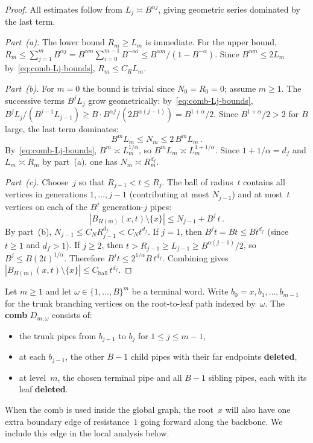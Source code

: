 \documentclass[11pt]{amsart}
\theoremstyle{plain}
\theoremstyle{definition}
\begin{document}
	\begin{proof}
		All estimates follow from $L_j\asymp B^{\alpha j}$, giving geometric series dominated by the last term.
		
		\emph{Part~\textup{(a)}.}  The lower bound $R_m\geq L_m$ is immediate.  For the upper bound, $R_m\leq\sum_{j=1}^m B^{\alpha j} =B^{\alpha m}\sum_{i=0}^{m-1}B^{-\alpha i} \leq B^{\alpha m}/(1-B^{-\alpha})$.  Since $B^{\alpha m}\leq 2L_m$ by~\eqref{eq:comb-Lj-bounds}, $R_m\leq C_R L_m$.
		
		\emph{Part~\textup{(b)}.}  For $m=0$ the bound is trivial since $N_0=R_0=0$; assume $m\geq 1$.
		The successive terms $B^j L_j$ grow geometrically: by~\eqref{eq:comb-Lj-bounds}, $B^j L_j/(B^{j-1}L_{j-1}) \geq B\cdot B^{\alpha j}/(2B^{\alpha(j-1)}) =B^{1+\alpha}/2$.  Since $B^{1+\alpha}/2>2$ for $B$ large, the last term dominates:
		\begin{equation}\label{eq:rec-Nm-asymp}
			B^m L_m\leq N_m\leq 2\,B^m L_m\,.
		\end{equation}
		By~\eqref{eq:comb-Lj-bounds}, $B^m\asymp L_m^{1/\alpha}$, so $B^m L_m\asymp L_m^{1+1/\alpha}$.  Since $1+1/\alpha=d_f$ and $L_m\asymp R_m$ by part~(a), one has $N_m\asymp R_m^{d_f}$.
		
		\emph{Part~\textup{(c)}.}  Choose~$j$ so that $R_{j-1}<t\leq R_j$.  The ball of radius~$t$ contains all vertices in generations $1,\ldots,j{-}1$ (contributing at most $N_{j-1}$) and at most~$t$ vertices on each of the $B^j$ generation-$j$ pipes:
		\begin{equation}\label{eq:rec-ball-bound}
			|B_{H(m)}(x,t)\setminus\{x\}|
			\leq N_{j-1}+B^j\,t\,.
		\end{equation}
		By part~(b), $N_{j-1}\leq C_N R_{j-1}^{d_f} <C_N t^{d_f}$.  If $j=1$, then $B^j t=Bt\leq B t^{d_f}$ (since $t\geq 1$ and $d_f>1$).  If $j\geq 2$, then $t>R_{j-1}\geq L_{j-1} \geq B^{\alpha(j-1)}/2$, so $B^j\leq B(2t)^{1/\alpha}$.  Therefore $B^j t\leq 2^{1/\alpha}B\,t^{d_f}$.  Combining gives $|B_{H(m)}(x,t)\setminus\{x\}| \leq C_{\mathrm{ball}}\,t^{d_f}$.
	\end{proof}
	
	Let $m\geq 1$ and let $\omega\in\{1,\ldots,B\}^m$ be a terminal word.  Write $b_0=x,b_1,\ldots,b_{m-1}$ for the trunk branching vertices on the root-to-leaf path indexed by~$\omega$.  The \textbf{comb} $D_{m,\omega}$ consists of:
	\begin{itemize}
		\item the trunk pipes from $b_{j-1}$ to $b_j$ for $1\leq j\leq m{-}1$,
		\item at each $b_{j-1}$, the other $B{-}1$ child pipes with their far endpoints \textbf{deleted},
		\item at level~$m$, the chosen terminal pipe and all $B{-}1$ sibling pipes, each with its leaf \textbf{deleted}.
	\end{itemize}
	When the comb is used inside the global graph, the root~$x$ will also have one extra boundary edge of resistance~$1$ going forward along the backbone.  We include this edge in the local analysis below.
	
\end{document}
